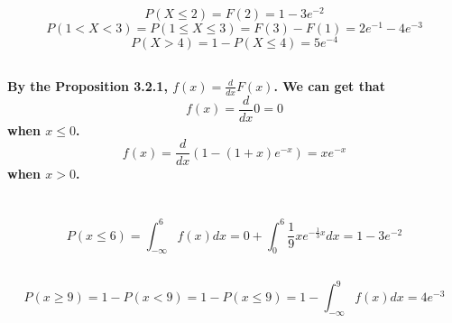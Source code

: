 \documentclass{article}
\begin{document}
    \section{}
        \subsection{}
            \paragraph{
                $$P(X\leq 2)=F(2)=1-3e^{-2}$$
                $$P(1<X<3)=P(1\leq X \leq 3 )=F(3)-F(1)=2e^{-1}-4e^{-3}$$
                $$P(X>4)=1-P(X\leq 4)=5e^{-4}$$
            }
        \subsection{}
            \paragraph{
                By the Proposition 3.2.1,
                $f(x)=\frac{d}{dx}F(x)$.
                We can get that
                $$f(x)=\frac{d}{dx} 0 =0$$
                when $x\leq0$.
                $$f(x)=\frac{d}{dx}(1-(1+x)e^{-x})=xe^{-x}$$
                when $x>0$.
            }
    \section{}
        \subsection{}
            \paragraph{
                $$P(x\leq 6)=\int _{-\infty} ^6 f(x)dx=0+\int _0 ^6 \frac{1}{9}xe^{-\frac{1}{3}x} dx=1-3e^{-2}$$
            }
        \subsection{}
            \paragraph{
                $$P(x\geq 9)=1-P(x<9)=1-P(x\leq 9)=1-\int _{-\infty} ^9 f(x)dx=4e^{-3}$$
            }
    \section{}
\end{document}
